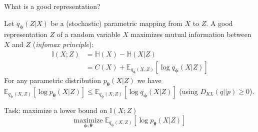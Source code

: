 \documentclass[handout]{beamer}
\begin{document}
  \begin{frame}{What is a good representation?}

    
    \small{Let $q_{\boldsymbol{\phi}}(Z|X)$ be a (stochastic) parametric mapping from $X$ to $Z$. A good representation $Z$ of a random variable $X$ maximizes \alert{mutual information} between $X$ and $Z$ (\emph{infomax principle}):}
    \vspace{0cm}
    \begin{align*}
      \mathbb{I}(X;Z) &= \mathbb{H}(X) - \mathbb{H}(X|Z)\\
                      &= C(X) + \mathbb{E}_{q_{\boldsymbol{\phi}}(X,Z)}\left[\log q_{\boldsymbol{\phi}}(X|Z)\right]
    \end{align*}
    \pause
    \small{For any parametric distribution $p_{\boldsymbol{\theta}}(X|Z)$ we have $\mathbb{E}_{q_{\boldsymbol{\phi}}(X,Z)}\left[\log p_{\boldsymbol{\theta}}(X|Z)\right] \leq \mathbb{E}_{q_{\boldsymbol{\phi}}(X,Z)}\left[\log q_{\boldsymbol{\phi}}(X|Z)\right]$ (using $D_{KL}(q||p) \geq 0$).}
    \pause
    \vspace{0.5cm}
    \begin{block}{Task: maximize a lower bound on $\mathbb{I}(X;Z)$}
      \begin{equation*}
        \underset{\boldsymbol{\phi},\boldsymbol{\theta}}{\text{maximize}} \; \mathbb{E}_{q_{\boldsymbol{\phi}}(X,Z)}\left[\log p_{\boldsymbol{\theta}}(X|Z)\right]
      \end{equation*}
    \end{block}

  \end{frame}
\end{document}
